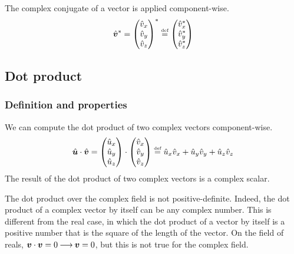 The complex conjugate of a vector is applied component-wise.
\begin{equation}
    \hat{\bm{v}}^*
    =
    \begin{pmatrix}
        \hat{v}_x \\ \hat{v}_y \\ \hat{v}_z
    \end{pmatrix}^*
    \stackrel{\text{\tiny def}}{=}
    \begin{pmatrix}
        \hat{v}_x^* \\ \hat{v}_y^* \\ \hat{v}_z^*
    \end{pmatrix}
\end{equation}







\subsection{Dot product}

\subsubsection{Definition and properties}

We can compute the dot product of two complex vectors component-wise.
\begin{equation}
    \hat{\bm{u}} \cdot \hat{\bm{v}}
    =
    \begin{pmatrix}
        \hat{u}_x \\ \hat{u}_y \\ \hat{u}_z
    \end{pmatrix}
    \cdot
    \begin{pmatrix}
        \hat{v}_x \\ \hat{v}_y \\ \hat{v}_z
    \end{pmatrix}
    \stackrel{\text{\tiny def}}{=}
    \hat{u}_x \hat{v}_x + \hat{u}_y \hat{v}_y + \hat{u}_z \hat{v}_z
\end{equation}
The result of the dot product of two complex vectors is a complex scalar.

The dot product over the complex field is not positive-definite.
Indeed, the dot product of a complex vector by itself can be any complex number.
This is different from the real case, in which the dot product of a vector by itself is a positive number that is the square of the length of the vector.
On the field of reals, $\bm{v} \cdot \bm{v}=0 \mathbin{\longrightarrow} \bm{v}=0$,
but this is not true for the complex field.

